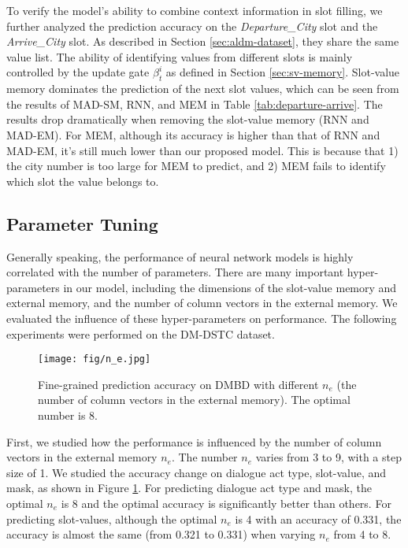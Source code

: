 To verify the model's ability to combine context information in slot filling, we further analyzed the prediction accuracy on the {\em Departure\_City} slot and the {\em Arrive\_City} slot. As described in Section \ref{sec:aldm-dataset}, they share the same value list. The ability of identifying values from different slots is mainly controlled by the update gate ${\beta}_t^i$ as defined in Section \ref{sec:sv-memory}. Slot-value memory dominates the prediction of the next slot values, which can be seen from the results of MAD-SM, RNN, and MEM in Table  \ref{tab:departure-arrive}. The results drop dramatically when removing the slot-value memory (RNN and MAD-EM).
For MEM, although its accuracy is higher than that of RNN and MAD-EM, it's still much lower than our proposed model. This is because that 1) the city number is too large for MEM to predict, and 2) MEM fails to identify which slot the value belongs to.


\subsection{Parameter Tuning}

Generally speaking, the performance of neural network models is highly correlated with the number of parameters. There are many important hyper-parameters in our model, including the dimensions of the slot-value memory and external memory, and the number of column vectors in the external memory. We evaluated the influence of these hyper-parameters on performance. The following experiments were performed on the DM-DSTC dataset.


\begin{figure}
  \texttt{[image: fig/n\_e.jpg]}
  \caption{Fine-grained prediction accuracy on DMBD with different $n_e$ (the number of column vectors in the external memory). The optimal number is 8.
  }
  \label{fig:n_e}
\end{figure}


First, we studied how the performance is influenced by the number of column vectors in the external memory $n_e$. The number $n_e$ varies from 3 to 9, with a step size of 1. We studied the accuracy change on dialogue act type, slot-value, and mask, as shown in Figure \ref{fig:n_e}. For predicting dialogue act type and mask, the optimal $n_e$ is 8 and the optimal accuracy is significantly better than others. For predicting slot-values, although the optimal $n_e$ is 4 with an accuracy of 0.331, the accuracy is almost the same (from 0.321 to 0.331) when varying $n_e$ from 4 to 8. 


